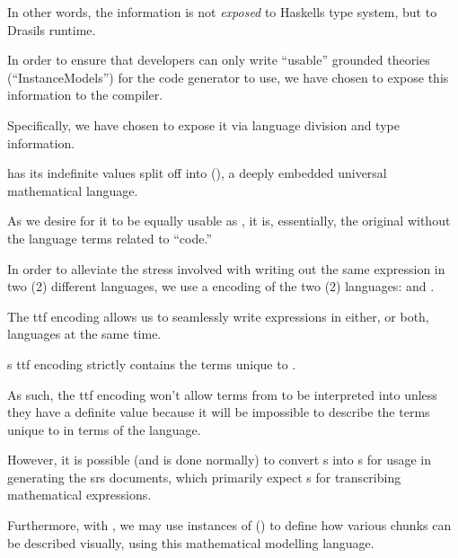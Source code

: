 In other words, the information is not \textit{exposed} to Haskells type system,
but to Drasils runtime.











In order to ensure that developers can only write ``usable'' grounded theories
(``InstanceModels'') for the code generator to use, we have chosen to expose
this information to the compiler.

Specifically, we have chosen to expose it via language division and type
information.

\languageDivision{}

\Expr{} has its indefinite values split off into \ModelExpr{}
(), a deeply embedded universal mathematical
language.

As we desire for it to be equally usable as \Expr{}, it is, essentially, the
original \Expr{} without the language terms related to ``code.''

In order to alleviate the stress involved with writing out the same expression
in two (2) different languages, we use a  encoding of the two (2)
languages:  and . 

The \acs{ttf} encoding allows us to seamlessly write expressions in either, or
both, languages at the same time. 

\ModelExpr{}s \acs{ttf} encoding strictly contains the terms unique to
\ModelExpr{}.

As such, the \acs{ttf} encoding won't allow terms from \ModelExpr{} to be
interpreted into \Expr{} unless they have a definite value because it will be
impossible to describe the terms unique to \ModelExpr{} in terms of the \Expr{}
language.

However, it is possible (and is done normally) to convert \Expr{}s into
\ModelExpr{}s for usage in generating the \acs{srs} documents, which primarily
expect \ModelExpr{}s for transcribing mathematical expressions.

Furthermore, with \ModelExpr{}, we may use instances of \Express{}
() to define how various chunks can be described
visually, using this mathematical modelling language.

\currentExpressHaskell{}

